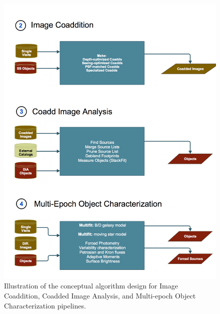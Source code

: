 \documentclass[12pt]{article}
\begin{document}
\begin{figure}[!th]
    \centering
    \vskip -0.2in
    \includegraphics[scale=0.535]{gliffy/CoaddedImageProcessing}
    \vskip -0.2in
    \caption{Illustration of the conceptual algorithm design for Image Coaddition, Coadded Image Analysis,
     and Multi-epoch Object Characterization pipelines.\label{fig:Pipes234}}
\end{figure}
\end{document}
